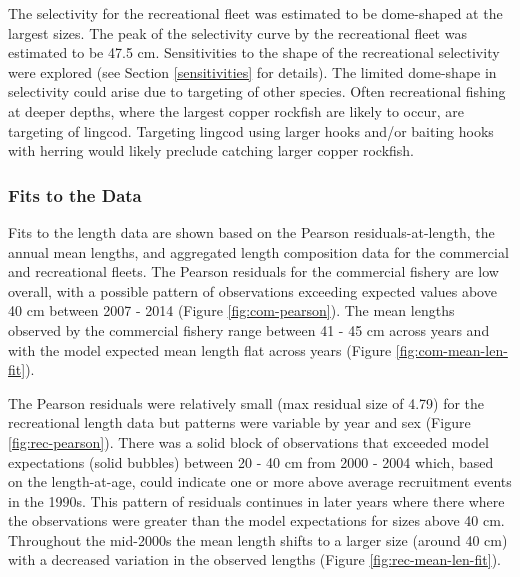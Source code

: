 \documentclass[11pt,
  english,
  a4paper,
]{article}
\begin{document}

The selectivity for the recreational fleet was estimated to be dome-shaped at the largest sizes. The peak of the selectivity curve by the recreational fleet was estimated to be 47.5 cm. Sensitivities to the shape of the recreational selectivity were explored (see Section \ref{sensitivities} for details). The limited dome-shape in selectivity could arise due to targeting of other species. Often recreational fishing at deeper depths, where the largest copper rockfish are likely to occur, are targeting of lingcod. Targeting lingcod using larger hooks and/or baiting hooks with herring would likely preclude catching larger copper rockfish.

\leavevmode\tagmcend\tagstructend\par


\hypertarget{fits-to-the-data}{%
\subsubsection{Fits to the Data}\label{fits-to-the-data}}

\leavevmode\tagmcend\tagstructend


Fits to the length data are shown based on the Pearson residuals-at-length, the annual mean lengths, and aggregated length composition data for the commercial and recreational fleets. The Pearson residuals for the commercial fishery are low overall, with a possible pattern of observations exceeding expected values above 40 cm between 2007 - 2014 (Figure \ref{fig:com-pearson}). The mean lengths observed by the commercial fishery range between 41 - 45 cm across years and with the model expected mean length flat across years (Figure \ref{fig:com-mean-len-fit}).

\leavevmode\tagmcend\tagstructend\par


The Pearson residuals were relatively small (max residual size of 4.79) for the recreational length data but patterns were variable by year and sex (Figure \ref{fig:rec-pearson}). There was a solid block of observations that exceeded model expectations (solid bubbles) between 20 - 40 cm from 2000 - 2004 which, based on the length-at-age, could indicate one or more above average recruitment events in the 1990s. This pattern of residuals continues in later years where there where the observations were greater than the model expectations for sizes above 40 cm. Throughout the mid-2000s the mean length shifts to a larger size (around 40 cm) with a decreased variation in the observed lengths (Figure \ref{fig:rec-mean-len-fit}).
\end{document}
